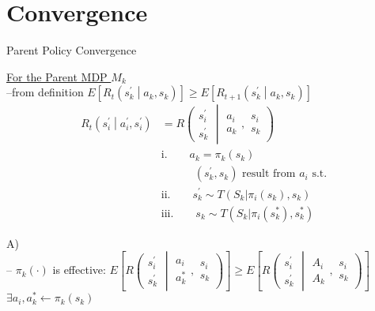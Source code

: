 \section{Convergence}
\label{sec:convergence} 

\begin{center}
Parent Policy Convergence
\end{center}

\underline{For the Parent MDP $M_k$}\\

--from definition $E\left[ R_t \left( s^\prime_k \middle| a_k, s_k \right) \right] \ge E\left[ R_{t+1}\left( s^\prime_k \middle| a_k, s_k  \right) \right]$\\
\begin{align*}
R_t\left( s^\prime_i \middle| a^\prime_i, s^\prime_i \right) & = R\left( \begin{array}{c} s^\prime_i \\ s^\prime_k \end{array} \middle| 
\begin{array}{c}a_i \\ a_k \end{array}, \begin{array}{c} s_i \\ s_k \end{array} \right)\\
& \text{i.}\qquad a_k = \pi_k( s_k )\\
& \qquad\quad ( s^\prime_k, s_k ) \text{\ result from\ }a_i\text{\ s.t.\ }\\
&\text{ii.}\qquad s^\prime_k \sim T( S_k | \pi_i( s_k ), s_k )\\
&\text{iii.}\qquad s_k \sim T( S_k | \pi_i( s^\ast_k ), s^\ast_k )
\end{align*}

A)\\
\boxed{$\textasteriskcentered$} -- $\pi_k(\cdot)$ is effective: $E\left[ R\left( \begin{array}{c} s^\prime_i \\ s^\prime_k \end{array} \middle| \begin{array}{c} a_i \\ a^\ast_k \end{array}, \begin{array}{c} s_i \\ s_k \end{array} \right) \right] 
\ge E\left[ R\left( \begin{array}{c} s^\prime_i \\ s^\prime_k \end{array} \middle| \begin{array}{c} A_i \\ A_k \end{array}, \begin{array}{c} s_i \\ s_k \end{array} \right) \right]$\\
\qquad\qquad$\exists a_i, a^\ast_k\leftarrow\pi_k(s_k)$\\

